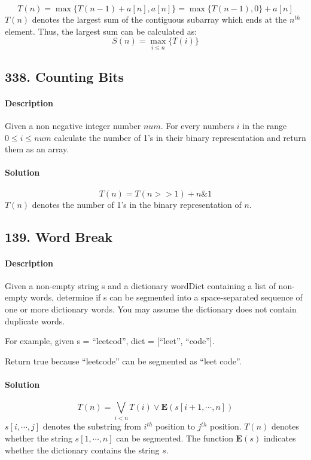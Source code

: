 $$T(n)=\max\{T(n-1)+a[n],a[n]\}=\max\{T(n-1),0\}+a[n]$$
$T(n)$ denotes the largest sum of the contiguous subarray which ends at the $n^{th}$ element. Thus, the largest sum can be calculated as:
$$S(n)=\max_{i\leqslant n}\{T(i)\}$$

\subsection{338. Counting Bits}

\paragraph{Description}

Given a non negative integer number $num$. For every numbers $i$ in the range $0\leqslant i\leqslant num$ calculate the number of 1's in their binary representation and return them as an array.

\paragraph{Solution}

$$T(n)=T(n>>1)+n\&1$$
$T(n)$ denotes the number of 1's in the binary representation of $n$.

\subsection{139. Word Break}

\paragraph{Description}

Given a non-empty string s and a dictionary wordDict containing a list of non-empty words, determine if s can be segmented into a space-separated sequence of one or more dictionary words. You may assume the dictionary does not contain duplicate words.

For example, given
s = ``leetcod'',
dict = [``leet'', ``code''].

Return true because ``leetcode'' can be segmented as ``leet code''.

\paragraph{Solution}

$$T(n)=\bigvee\limits_{i<n}{T(i)\vee \bm{E}(s[i+1,\cdots,n])}$$
$s[i,\cdots,j]$ denotes the substring from $i^{th}$ position to $j^{th}$ position. $T(n)$ denotes whether the string $s[1,\cdots,n]$ can be segmented. The function $\bm{E}(s)$ indicates whether the dictionary contains the string $s$.

